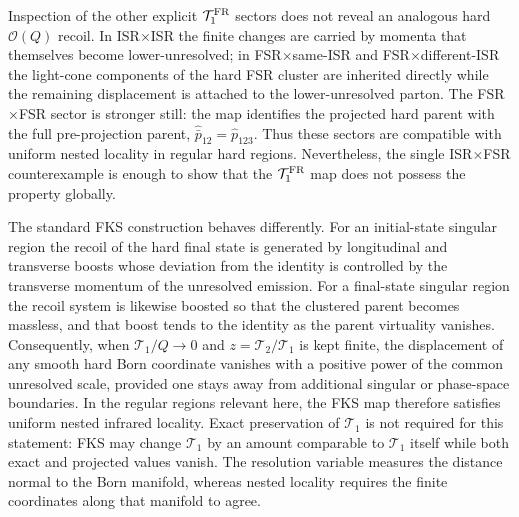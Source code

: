 \documentclass[11pt]{article}
\begin{document}
Inspection of the other explicit $\mathcal T_1^{\rm FR}$ sectors does not reveal an analogous hard
$\mathcal O(Q)$ recoil.  In ISR$\times$ISR the finite changes are carried by momenta that themselves become
lower-unresolved; in FSR$\times$same-ISR and FSR$\times$different-ISR the light-cone components of the hard
FSR cluster are inherited directly while the remaining displacement is attached to the lower-unresolved
parton.  The FSR$\times$FSR sector is stronger still: the map identifies the projected hard parent with the
full pre-projection parent, $\hat{\bar p}_{12}=\hat p_{123}$.  Thus these sectors are compatible with uniform
nested locality in regular hard regions.  Nevertheless, the single ISR$\times$FSR counterexample is enough
to show that the $\mathcal T_1^{\rm FR}$ map does not possess the property globally.

The standard FKS construction behaves differently.  For an initial-state singular region the recoil of the
hard final state is generated by longitudinal and transverse boosts whose deviation from the identity is
controlled by the transverse momentum of the unresolved emission.  For a final-state singular region the
recoil system is likewise boosted so that the clustered parent becomes massless, and that boost tends to the
identity as the parent virtuality vanishes.  Consequently, when $\mathcal T_1/Q\to0$ and
$z=\mathcal T_2/\mathcal T_1$ is kept finite, the displacement of any smooth hard Born coordinate vanishes
with a positive power of the common unresolved scale, provided one stays away from additional singular or
phase-space boundaries.  In the regular regions relevant here, the FKS map therefore satisfies uniform nested
infrared locality.  Exact preservation of $\mathcal T_1$ is not required for this statement: FKS may change
$\mathcal T_1$ by an amount comparable to $\mathcal T_1$ itself while both exact and projected values vanish.
The resolution variable measures the distance normal to the Born manifold, whereas nested locality requires
the finite coordinates along that manifold to agree.

\medskip
\noindent
{}
\medskip
\end{document}
